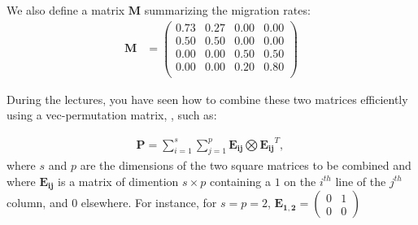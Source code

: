 \documentclass{article}\usepackage[]{graphicx}\usepackage[]{color}
\begin{document}
We also define a matrix $\boldsymbol{M}$ summarizing the migration rates:
\begin{align*}\boldsymbol{M} &=%
\begin{pmatrix}{}
  0.73 & 0.27 & 0.00 & 0.00 \\ 
  0.50 & 0.50 & 0.00 & 0.00 \\ 
  0.00 & 0.00 & 0.50 & 0.50 \\ 
  0.00 & 0.00 & 0.20 & 0.80 \\ 
  \end{pmatrix}
\end{align*}

During the lectures, you have seen how to combine these two matrices efficiently using a vec-permutation matrix, , such as: 

\begin{align*}
\boldsymbol{P} = \sum\limits_{i=1}^s  \sum\limits_{j=1}^p \boldsymbol{E_{ij}} \bigotimes \boldsymbol{E_{ij}}^T\text{, }
\end{align*}
where $s$ and $p$ are the dimensions of the two square matrices to be combined and where $\boldsymbol{E_{ij}}$ is a matrix of dimention $s\times p$ containing a $1$ on the $i^{th}$ line of the $j^{th}$ column, and $0$ elsewhere. 
For instance, for $s=p=2$, $\boldsymbol{E_{1,2}} = \begin{pmatrix} 0 & 1 \\ 0 & 0 \end{pmatrix}$
\end{document}
